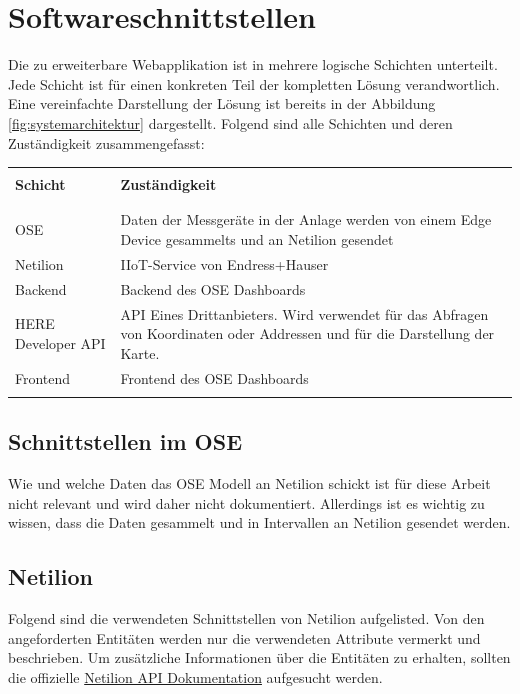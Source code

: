 \section{Softwareschnittstellen}
Die zu erweiterbare Webapplikation ist in mehrere logische Schichten unterteilt. Jede Schicht ist für einen konkreten Teil der kompletten Lösung verandwortlich. Eine vereinfachte Darstellung der Lösung ist bereits in der Abbildung \ref{fig:systemarchitektur} dargestellt. Folgend sind alle Schichten und deren Zuständigkeit zusammengefasst:
\begin{table}[H]
  \begin{tabularx}{\textwidth}{l X}\hline \\
  \textbf{Schicht} & \textbf{Zuständigkeit}  \\ \\\hline \\
  OSE & Daten der Messgeräte in der Anlage werden von einem Edge Device gesammelts und an Netilion gesendet \\
  Netilion & IIoT-Service von Endress+Hauser \\
  Backend & Backend des OSE Dashboards \\
  HERE Developer API & API Eines Drittanbieters. Wird verwendet für das Abfragen von Koordinaten oder Addressen und für die Darstellung der Karte. \\
  Frontend & Frontend des OSE Dashboards \\
  \\\hline
  \end{tabularx}
\end{table}
\subsection{Schnittstellen im OSE}
Wie und welche Daten das OSE Modell an Netilion schickt ist für diese Arbeit nicht relevant und wird daher nicht dokumentiert. Allerdings ist es wichtig zu wissen, dass die Daten gesammelt und in Intervallen an Netilion gesendet werden.
\subsection{Netilion}
Folgend sind die verwendeten Schnittstellen von Netilion aufgelisted. Von den angeforderten Entitäten werden nur die verwendeten Attribute vermerkt und beschrieben. Um zusätzliche Informationen über die Entitäten zu erhalten, sollten die offizielle \href{https://api.iiot.endress.com/doc/v1/}{Netilion API Dokumentation} aufgesucht werden.
